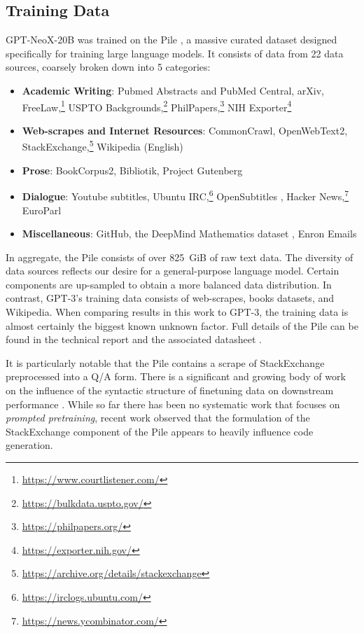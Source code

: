 \documentclass[11pt]{article}
\newcommand{\model}{GPT-NeoX-20B}
\begin{document}
\subsection{Training Data}
\label{sec:training-data}

\model{} was trained on the Pile \citep{gao2020pile}, a massive curated dataset designed specifically for training large language models. It consists of data from 22 data sources, coarsely broken down into 5 categories:

\begin{itemize}
    \item \textbf{Academic Writing}: Pubmed Abstracts and PubMed Central, arXiv, FreeLaw,\footnote{\url{https://www.courtlistener.com/}} USPTO Backgrounds,\footnote{\url{https://bulkdata.uspto.gov/}} PhilPapers,\footnote{\url{https://philpapers.org/}} NIH Exporter\footnote{\url{https://exporter.nih.gov/}}
    \item \textbf{Web-scrapes and Internet Resources}: CommonCrawl, OpenWebText2, StackExchange,\footnote{\url{https://archive.org/details/stackexchange}} Wikipedia (English)
    \item \textbf{Prose}: BookCorpus2, Bibliotik, Project Gutenberg \citep[PG-19;][]{rae2019compressive}
    \item \textbf{Dialogue}: Youtube subtitles, Ubuntu IRC,\footnote{\url{https://irclogs.ubuntu.com/}} OpenSubtitles \citep{lison-tiedemann-2016-opensubtitles2016}, Hacker News,\footnote{\url{https://news.ycombinator.com/}} EuroParl \citep{koehn-2005-europarl}
    \item \textbf{Miscellaneous}: GitHub, the DeepMind Mathematics dataset \citep{saxton2019analysing}, Enron Emails \citep{10.1007/978-3-540-30115-8_22}
\end{itemize}

In aggregate, the Pile consists of over 825~GiB of raw text data. The diversity of data sources reflects our desire for a general-purpose language model. Certain components are up-sampled to obtain a more balanced data distribution. In contrast, GPT-3's training data consists of web-scrapes, books datasets, and Wikipedia. When comparing results in this work to GPT-3, the training data is almost certainly the biggest known unknown factor. Full details of the Pile can be found in the technical report \citep{gao2020pile} and the associated datasheet \citep{biderman2022datasheet}.

It is particularly notable that the Pile contains a scrape of StackExchange preprocessed into a Q/A form. There is a significant and growing body of work on the influence of the syntactic structure of finetuning data on downstream performance \citep{zhong2021adapting,tan2021msp,sanh2021multitask,wei2021finetuned}. While so far there has been no systematic work that focuses on \textit{prompted pretraining}, recent work \citep{biderman2022neural} observed that the formulation of the StackExchange component of the Pile appears to heavily influence code generation. 
\end{document}
